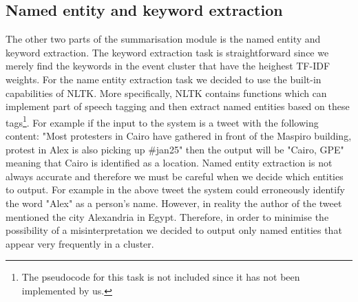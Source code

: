 \subsection{Named entity and keyword extraction}
The other two parts of the summarisation module is the named entity and keyword extraction. The keyword extraction task is straightforward since we merely
find the keywords in the event cluster that have the heighest TF-IDF weights. For the name entity extraction task we decided to use the built-in capabilities of NLTK. More specifically, NLTK contains functions which can implement part of speech tagging and then extract named entities based on these tags\footnote{The pseudocode for this task is not included since it has not been implemented by us.}. For example if the input to the system is a tweet with the following content: "Most protesters in Cairo have gathered in front of the Maspiro building, protest in Alex is also picking up ‪\#jan25" then the output will be "Cairo, GPE" meaning that Cairo is identified as a location. Named entity extraction is not always accurate and therefore we must be careful when we decide which entities to output. For example in the above tweet the system could erroneously identify the word "Alex" as a person's name. However, in reality the author of the tweet mentioned the city Alexandria in Egypt. Therefore, in order to minimise the possibility of a misinterpretation we decided to output only named entities that appear very frequently in a cluster. 

